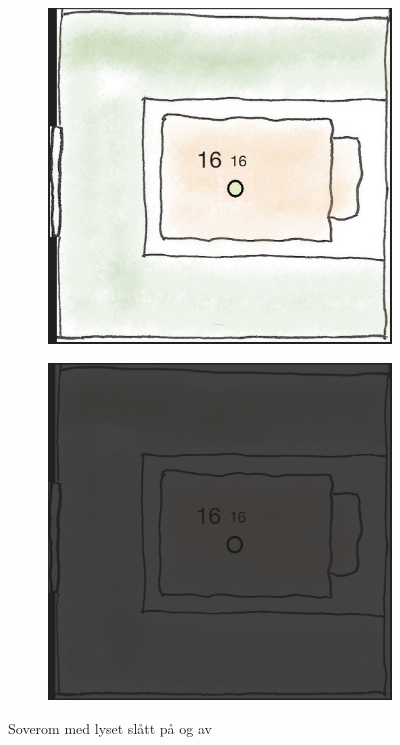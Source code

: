 \begin{figure}[ht]
\centering
\begin{subfigure}{0.32\textwidth}
\centering
\includegraphics[scale=0.1]{fig/bedroom}
\caption{}
\label{fig:bedroomon}
\end{subfigure}
\begin{subfigure}{0.32\textwidth}
\centering
\includegraphics[scale=0.1]{fig/bedroom2}
\caption{}
\label{fig:bedroomoff}
\end{subfigure}
\caption{Soverom med lyset slått på og av}
\label{fig:bedroomonoff}
\end{figure}

